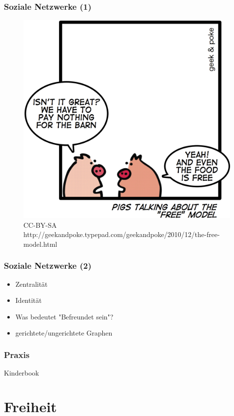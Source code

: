 \documentclass{beamer}
\begin{document}
\begin{frame}
  \frametitle{Soziale Netzwerke (1)}
  \begin{figure}
    \includegraphics[height=0.6\textheight]{img/business_pigs.jpg}
    \caption{CC-BY-SA http://geekandpoke.typepad.com/geekandpoke/2010/12/the-free-model.html}
  \end{figure}
\end{frame}

\begin{frame}
  \frametitle{Soziale Netzwerke (2)}
  \begin{itemize}
    \item<1-> Zentralität
    \item<2-> Identität
    \item<3-> Was bedeutet "Befreundet sein"?
    \item<4-> gerichtete/ungerichtete Graphen
  \end{itemize}
\end{frame}

\begin{frame}
  \frametitle{Praxis}
  Kinderbook
\end{frame}

\section{Freiheit}
\end{document}
